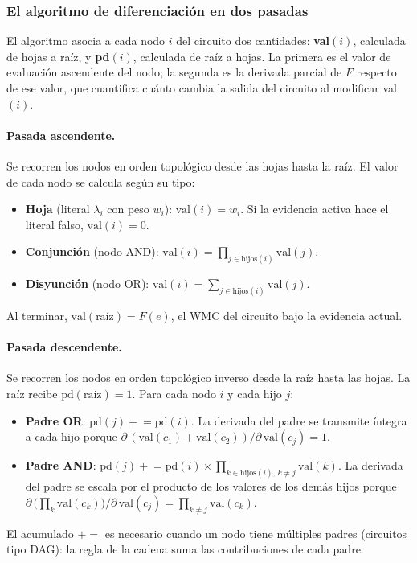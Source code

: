 \subsubsection{El algoritmo de diferenciación en dos pasadas}
\label{sec:di-algoritmo-darwiche}

El algoritmo asocia a cada nodo $i$ del circuito dos cantidades:
\textbf{val}$(i)$, calculada de hojas a raíz, y \textbf{pd}$(i)$, calculada de
raíz a hojas. La primera es el valor de evaluación ascendente del nodo; la segunda
es la derivada parcial de $F$ respecto de ese valor, que cuantifica cuánto cambia
la salida del circuito al modificar val$(i)$.

\paragraph{Pasada ascendente.}
Se recorren los nodos en orden topológico desde las hojas hasta la raíz. El valor
de cada nodo se calcula según su tipo:
\begin{itemize}
    \item \textbf{Hoja} (literal $\lambda_i$ con peso $w_i$): $\text{val}(i) = w_i$.
        Si la evidencia activa hace el literal falso, $\text{val}(i) = 0$.
    \item \textbf{Conjunción} (nodo AND): $\text{val}(i) = \prod_{j \in \text{hijos}(i)} \text{val}(j)$.
    \item \textbf{Disyunción} (nodo OR): $\text{val}(i) = \sum_{j \in \text{hijos}(i)} \text{val}(j)$.
\end{itemize}
Al terminar, $\text{val}(\text{raíz}) = F(e)$, el WMC del circuito bajo la
evidencia actual.

\paragraph{Pasada descendente.}
Se recorren los nodos en orden topológico inverso desde la raíz hasta las hojas.
La raíz recibe $\text{pd}(\text{raíz}) = 1$. Para cada nodo $i$ y cada hijo $j$:
\begin{itemize}
    \item \textbf{Padre OR}: $\text{pd}(j) \mathrel{+}= \text{pd}(i)$.
        La derivada del padre se transmite íntegra a cada hijo porque
        $\partial\,(\text{val}(c_1) + \text{val}(c_2)) / \partial\,\text{val}(c_j) = 1$.
    \item \textbf{Padre AND}: $\text{pd}(j) \mathrel{+}=
        \text{pd}(i) \times \prod_{k \in \text{hijos}(i),\, k \neq j} \text{val}(k)$.
        La derivada del padre se escala por el producto de los valores de los
        demás hijos porque
        $\partial\,\bigl(\prod_k \text{val}(c_k)\bigr) / \partial\,\text{val}(c_j)
        = \prod_{k \neq j} \text{val}(c_k)$.
\end{itemize}
El acumulado $\mathrel{+}=$ es necesario cuando un nodo tiene múltiples padres
(circuitos tipo DAG): la regla de la cadena suma las contribuciones de cada padre.

